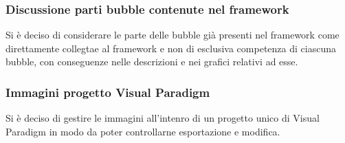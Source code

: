 \subsubsection{Discussione parti bubble contenute nel framework }
Si è deciso di considerare le parte delle bubble già presenti nel framework come direttamente collegtae al framework e non di esclusiva competenza di ciascuna bubble, con conseguenze nelle descrizioni e nei grafici relativi ad esse.

\subsubsection{Immagini progetto Visual Paradigm}
Si è deciso di gestire le immagini all'intenro di un progetto unico di Visual Paradigm in modo da poter controllarne esportazione e modifica.

\clearpage
